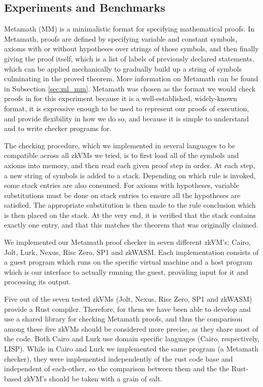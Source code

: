 \documentclass{article}
\theoremstyle{plain}
\theoremstyle{definition}
\begin{document}
\subsection{Experiments and Benchmarks} \label{sec:mm_experiment}

Metamath (MM) is a minimalistic format for specifying mathematical proofs. In Metamath, proofs are defined by specifying variable and constant symbols, axioms with or without hypotheses over strings of those symbols, and then finally giving the proof itself, which is a list of labels of previously declared statements, which can be applied mechanically to gradually build up a string of symbols culminating in the proved theorem. More information on Metamath can be found in Subsection \ref{sec:ml_mm}. Metamath was chosen as the format we would check proofs in for this experiment because it is a well-established, widely-known format, it is expressive enough to be used to represent our proofs of execution, and provide flexibility in how we do so, and because it is simple to understand and to write checker programs for.

The checking procedure, which we implemented in several languages to be compatible across all zkVMs we tried, is to first load all of the symbols and axioms into memory, and then read each given proof step in order. At each step, a new string of symbols is added to a stack. Depending on which rule is invoked, some stack entries are also consumed. For axioms with hypotheses, variable substitutions must be done on stack entries to ensure all the hypotheses are satisfied. The appropriate substitution is then made to the rule conclusion which is then placed on the stack. At the very end, it is verified that the stack contains exactly one entry, and that this matches the theorem that was originally claimed. 

We implemented our Metamath proof checker in seven different zkVM's: Cairo, Jolt, Lurk, Nexus, Risc Zero, SP1 and zkWASM. Each implementation consists of a guest program which runs on the specific virtual machine and a host program which is our interface to actually running the guest, providing input for it and processing its output. 

Five  out of the seven tested zkVMs (Jolt, Nexus, Risc Zero, SP1 and zkWASM) provide a Rust compiler. Therefore, for them we have been able to develop and use a shared library for checking Metamath proofs, and thus the comparison among these five zkVMs should be considered more precise, as they share most of the code. Both Cairo and Lurk use domain specific languages (Cairo, respectively, LISP). While in Cairo and Lurk we implemented the same program (a Metamath checker), they were implemented independently of the rust code base and independent of each-other, so the comparison between them and the the Rust-based zkVM's should be taken with a grain of salt. 
\end{document}
